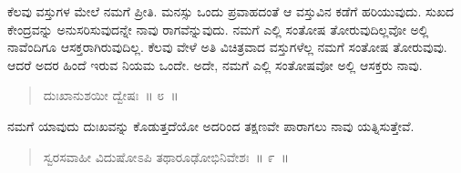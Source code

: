 \vspace{-0.3cm}


\vskip 0.2cm 

ಕೆಲವು ವಸ್ತುಗಳ ಮೇಲೆ ನಮಗೆ ಪ್ರೀತಿ. ಮನಸ್ಸು ಒಂದು ಪ್ರವಾಹದಂತೆ ಆ ವಸ್ತುವಿನ ಕಡೆಗೆ ಹರಿಯುವುದು. ಸುಖದ ಕೇಂದ್ರವನ್ನು ಅನುಸರಿಸುವುದನ್ನೇ ನಾವು ರಾಗವೆನ್ನುವುದು. ನಮಗೆ ಎಲ್ಲಿ ಸಂತೋಷ ತೋರುವುದಿಲ್ಲವೋ ಅಲ್ಲಿ ನಾವೆಂದಿಗೂ ಆಸಕ್ತರಾಗಿರುವುದಿಲ್ಲ. ಕೆಲವು ವೇಳೆ ಅತಿ ವಿಚಿತ್ರವಾದ ವಸ್ತುಗಳೆಲ್ಲ ನಮಗೆ ಸಂತೋಷ ತೋರುವುವು. ಆದರೆ ಅದರ ಹಿಂದೆ ಇರುವ ನಿಯಮ ಒಂದೇ. ಅದೇ, ನಮಗೆ ಎಲ್ಲಿ ಸಂತೋಷವೋ ಅಲ್ಲಿ ಆಸಕ್ತರು ನಾವು. 

\vspace{-0.3cm}

\begin{verse}
ದುಃಖಾನುಶಯೀ ದ್ವೇಷಃ~॥ ೮~॥
\end{verse}

\vspace{-0.3cm}


\vskip 0.2cm 

ನಮಗೆ ಯಾವುದು ದುಃಖವನ್ನು ಕೊಡುತ್ತದೆಯೋ ಅದರಿಂದ ತಕ್ಷಣವೇ ಪಾರಾಗಲು ನಾವು ಯತ್ನಿಸುತ್ತೇವೆ. 

\vspace{-0.3cm}

\begin{verse}
ಸ್ವರಸವಾಹೀ ವಿದುಷೋಽಪಿ ತಥಾರೂಢೋಭಿನಿವೇಶಃ~॥ ೯~॥
\end{verse}

\vspace{-0.3cm}


\vskip 0.2cm 

